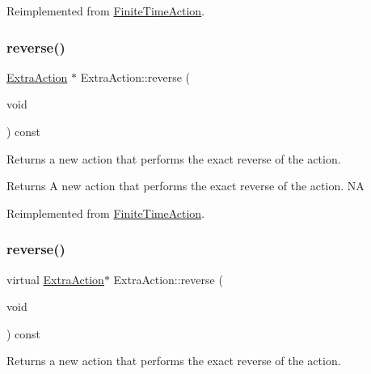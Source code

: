 Reimplemented from \hyperlink{classFiniteTimeAction_a44813fca4fdf22f367a4657147dd150b}{Finite\+Time\+Action}.

\mbox{\label{classExtraAction_ac249af1bbc5f965c52e04a254ef84246}} 
\subsubsection{\texorpdfstring{reverse()}{reverse()}\hspace{0.1cm}{\footnotesize\ttfamily [1/2]}}
{\footnotesize\ttfamily \hyperlink{classExtraAction}{Extra\+Action} $\ast$ Extra\+Action\+::reverse (\begin{DoxyParamCaption}\item[{void}]{ }\end{DoxyParamCaption}) const\hspace{0.3cm}{\ttfamily [virtual]}}

Returns a new action that performs the exact reverse of the action.

\begin{DoxyReturn}{Returns}
A new action that performs the exact reverse of the action.  NA 
\end{DoxyReturn}


Reimplemented from \hyperlink{classFiniteTimeAction_a886bbdd2dc82167fe6ffae664c22dacc}{Finite\+Time\+Action}.

\mbox{\label{classExtraAction_afc325a6f88855b68c6f29eeed4505316}} 
\subsubsection{\texorpdfstring{reverse()}{reverse()}\hspace{0.1cm}{\footnotesize\ttfamily [2/2]}}
{\footnotesize\ttfamily virtual \hyperlink{classExtraAction}{Extra\+Action}$\ast$ Extra\+Action\+::reverse (\begin{DoxyParamCaption}\item[{void}]{ }\end{DoxyParamCaption}) const\hspace{0.3cm}{\ttfamily [virtual]}}

Returns a new action that performs the exact reverse of the action.


